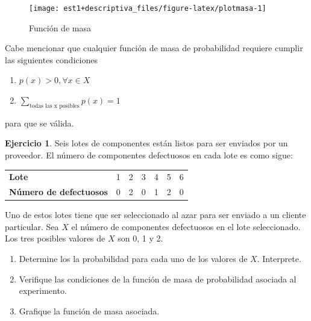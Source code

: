 \documentclass[
  11pt,
]{book}
\providecommand{\tightlist}{%
  \setlength{\itemsep}{0pt}\setlength{\parskip}{0pt}}
\theoremstyle{definition}
\theoremstyle{definition}
\theoremstyle{definition}
\newtheorem{exercise}{Ejercicio}[chapter]
\theoremstyle{definition}
\theoremstyle{remark}
\begin{document}
\begin{figure}

{\centering \texttt{[image: est1+descriptiva\_files/figure-latex/plotmasa-1]} 

}

\caption{Función de masa}\label{fig:plotmasa}
\end{figure}

Cabe mencionar que cualquier función de masa de probabilidad requiere cumplir las siguientes condiciones

\begin{enumerate}
\def\labelenumi{\arabic{enumi}.}
\tightlist
\item
  \(p(x) > 0, \forall x \in X\)
\item
  \(\displaystyle\sum_{\text{todas las x posibles}} p(x) = 1\)
\end{enumerate}

para que se válida.

\begin{exercise}

Seis lotes de componentes están listos para ser enviados por un proveedor. El número de componentes defectuosos en cada lote es como sigue:

\begin{table}[H]
\centering
\begin{tabular}[t]{>{}lclclcl}
\toprule
\textbf{Lote} & 1 & 2 & 3 & 4 & 5 & 6\\
\textbf{Número de defectuosos} & 0 & 2 & 0 & 1 & 2 & 0\\
\bottomrule
\end{tabular}
\end{table}

\end{exercise}

Uno de estos lotes tiene que ser seleccionado al azar para ser enviado a un cliente particular. Sea \(X\) el número de componentes defectuosos en el lote seleccionado. Los tres posibles valores de \(X\) son 0, 1 y 2.

\begin{enumerate}
\def\labelenumi{\alph{enumi}.}
\tightlist
\item
  Determine los la probabilidad para cada uno de los valores de \(X\). Interprete.
\item
  Verifique las condiciones de la función de masa de probabilidad asociada al experimento.
\item
  Grafique la función de masa asociada.
\end{enumerate}
\end{document}
